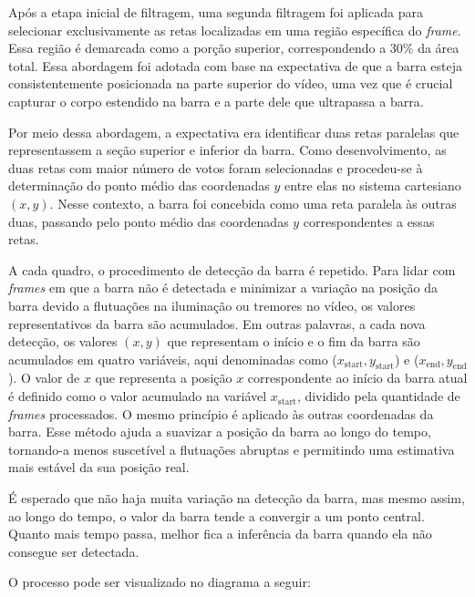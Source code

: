 Após a etapa inicial de filtragem, uma segunda filtragem foi aplicada para selecionar exclusivamente as retas localizadas em uma região específica do \textit{frame}. Essa região é demarcada como a porção superior, correspondendo a 30\% da área total. Essa abordagem foi adotada com base na expectativa de que a barra esteja consistentemente posicionada na parte superior do vídeo, uma vez que é crucial capturar o corpo estendido na barra e a parte dele que ultrapassa a barra.

Por meio dessa abordagem, a expectativa era identificar duas retas paralelas que representassem a seção superior e inferior da barra. Como desenvolvimento, as duas retas com maior número de votos foram selecionadas e procedeu-se à determinação do ponto médio das coordenadas $y$ entre elas no sistema cartesiano $(x, y)$. Nesse contexto, a barra foi concebida como uma reta paralela às outras duas, passando pelo ponto médio das coordenadas $y$ correspondentes a essas retas.

A cada quadro, o procedimento de detecção da barra é repetido. Para lidar com \textit{frames} em que a barra não é detectada e minimizar a variação na posição da barra devido a flutuações na iluminação ou tremores no vídeo, os valores representativos da barra são acumulados. Em outras palavras, a cada nova detecção, os valores $(x,y)$ que representam o início e o fim da barra são acumulados em quatro variáveis, aqui denominadas como ($x_{\text{start}}, y_{\text{start}}$) e ($x_{\text{end}}, y_{\text{end}}$). O valor de $x$ que representa a posição $x$ correspondente ao início da barra atual é definido como o valor acumulado na variável $x_{\text{start}}$, dividido pela quantidade de \textit{frames} processados. O mesmo princípio é aplicado às outras coordenadas da barra. Esse método ajuda a suavizar a posição da barra ao longo do tempo, tornando-a menos suscetível a flutuações abruptas e permitindo uma estimativa mais estável da sua posição real.

É esperado que não haja muita variação na detecção da barra, mas mesmo assim, ao longo do tempo, o valor da barra tende a convergir a um ponto central. Quanto mais tempo passa, melhor fica a inferência da barra quando ela não consegue ser detectada.


O processo pode ser visualizado no diagrama a seguir:


